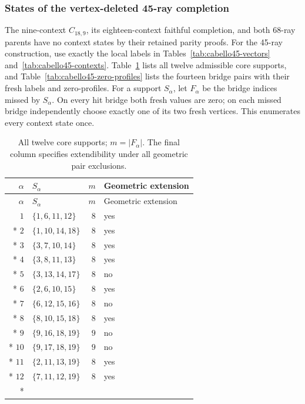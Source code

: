 \documentclass[aps,pra,reprint,superscriptaddress,longbibliography,nofootinbib,floatfix,10pt]{revtex4-2}
\theoremstyle{definition}
\begin{document}
\subsubsection{States of the vertex-deleted 45-ray completion}
\label{app:cabello-states}
The nine-context $C_{18,9}$, its eighteen-context faithful completion,
and both 68-ray parents have no context states by their retained
parity proofs. For the 45-ray construction, use exactly the local
labels in Tables~\ref{tab:cabello45-vectors} and~\ref{tab:cabello45-contexts}.
Table~\ref{tab:cabello45-core-states} lists all twelve admissible core
supports, and Table~\ref{tab:cabello45-zero-profiles} lists the fourteen
bridge pairs with their fresh labels and zero-profiles. For a support $S_\alpha$, let $F_\alpha$ be the bridge
indices missed by $S_\alpha$. On every hit bridge both fresh values
are zero; on each missed bridge independently choose exactly one
of its two fresh vertices. This enumerates every context state once.
\begingroup\small
{}
\begin{longtable}{rlrl}
\caption{All twelve core supports; $m=|F_\alpha|$. The final column specifies extendibility under all geometric pair exclusions.}\label{tab:cabello45-core-states}\\
\toprule
$\alpha$ & $S_\alpha$ & $m$ & Geometric extension\\\midrule
\endfirsthead
\toprule
$\alpha$ & $S_\alpha$ & $m$ & Geometric extension\\\midrule
\endhead
\bottomrule\endfoot
$1$ & $\{1,6,11,12\}$ & $8$ & yes\\*
$2$ & $\{1,10,14,18\}$ & $8$ & yes\\*
$3$ & $\{3,7,10,14\}$ & $8$ & yes\\*
$4$ & $\{3,8,11,13\}$ & $8$ & yes\\*
$5$ & $\{3,13,14,17\}$ & $8$ & no\\*
$6$ & $\{2,6,10,15\}$ & $8$ & yes\\*
$7$ & $\{6,12,15,16\}$ & $8$ & no\\*
$8$ & $\{8,10,15,18\}$ & $8$ & yes\\*
$9$ & $\{9,16,18,19\}$ & $9$ & no\\*
$10$ & $\{9,17,18,19\}$ & $9$ & no\\*
$11$ & $\{2,11,13,19\}$ & $8$ & yes\\*
$12$ & $\{7,11,12,19\}$ & $8$ & yes\\*
\end{longtable}
\endgroup
\begingroup\small
{}
\end{document}
